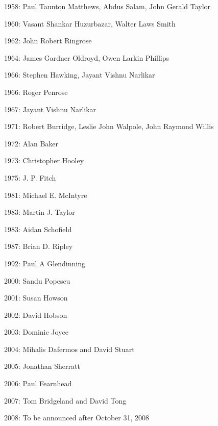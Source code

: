 \documentclass[12pt]{article}
\begin{document}
1958: Paul Taunton Matthews, Abdus Salam, John Gerald Taylor

1960: Vasant Shankar Huzurbazar, Walter Laws Smith

1962: John Robert Ringrose

1964: James Gardner Oldroyd, Owen Larkin Phillips

1966: Stephen Hawking, Jayant Vishnu Narlikar

1966: Roger Penrose

1967: Jayant Vishnu Narlikar

1971: Robert Burridge, Leslie John Walpole, John Raymond Willis

1972: Alan Baker

1973: Christopher Hooley

1975: J. P. Fitch

1981: Michael E. McIntyre

1983: Martin J. Taylor

1983: Aidan Schofield

1987: Brian D. Ripley

1992: Paul A Glendinning

2000: Sandu Popescu

2001: Susan Howson

2002: David Hobson

2003: Dominic Joyce

2004: Mihalis Dafermos and David Stuart

2005: Jonathan Sherratt

2006: Paul Fearnhead

2007: Tom Bridgeland and David Tong

2008: To be announced after October 31, 2008
\end{document}

